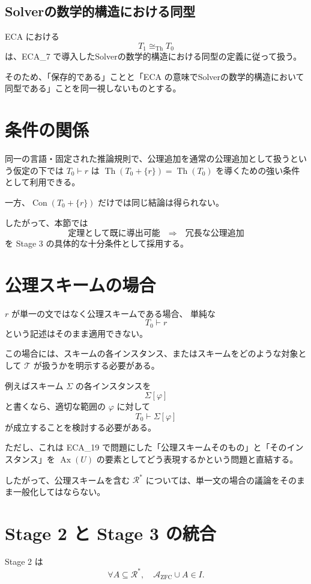 \documentclass[a4paper,11pt]{article}
\begin{document}
\subsection{Solverの数学的構造における同型}
ECA における
\[
T_1\cong_{\mathrm{Th}}T_0
\]
は、ECA_7 で導入したSolverの数学的構造における同型の定義に従って扱う。

そのため、「保存的である」ことと「ECA の意味でSolverの数学的構造において同型である」ことを同一視しないものとする。

\section{条件の関係}
同一の言語・固定された推論規則で、公理追加を通常の公理追加として扱うという仮定の下では $T_0\vdash r$ は $\operatorname{Th}(T_0+\{r\}) = \operatorname{Th}(T_0)$ を導くための強い条件として利用できる。

一方、$\operatorname{Con}(T_0+\{r\})$ だけでは同じ結論は得られない。

したがって、本節では
\[
\boxed{
\text{定理として既に導出可能}
\quad\Rightarrow\quad
\text{冗長な公理追加}
}
\]
を Stage 3 の具体的な十分条件として採用する。

\section{公理スキームの場合}
$r$ が単一の文ではなく公理スキームである場合、
単純な
\[
T_0\vdash r
\]
という記述はそのまま適用できない。

この場合には、スキームの各インスタンス、またはスキームをどのような対象として $\mathcal{T}$ が扱うかを明示する必要がある。

例えばスキーム $\Sigma$ の各インスタンスを
\[
\Sigma[\varphi]
\]
と書くなら、適切な範囲の $\varphi$ に対して
\[
T_0\vdash\Sigma[\varphi]
\]
が成立することを検討する必要がある。

ただし、これは ECA_19 で問題にした「公理スキームそのもの」と「そのインスタンス」を $\operatorname{Ax}(U)$ の要素としてどう表現するかという問題と直結する。

したがって、公理スキームを含む $\mathcal{R}^*$ については、単一文の場合の議論をそのまま一般化してはならない。

\section{Stage 2 と Stage 3 の統合}

Stage 2 は
\[
\forall A\subseteq\mathcal{R}^*,\quad
\mathcal{A}_{\mathrm{ZFC}}\cup A\in I.
\]
\end{document}
